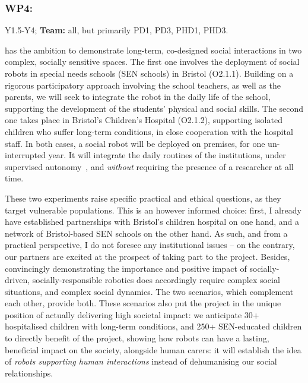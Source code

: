 \subsubsection{WP4: \textbf{\WPD}}

\begin{framed}
 Y1.5-Y4; {\bf Team:} all, but primarily PD1, PD3, PHD1, PHD3.
\end{framed}


\begin{rewrite}

\project has the ambition to demonstrate long-term, co-designed social
interactions in two complex, socially sensitive spaces.
The first one involves the deployment of social robots in special needs schools
(SEN schools) in Bristol (O2.1.1). Building on a rigorous participatory approach
involving the school teachers, as well as the parents, we will seek to integrate
the robot in the daily life of the school, supporting the development of the
students' physical and social skills. The second one takes place in Bristol's
Children's Hospital (O2.1.2), supporting isolated children who suffer long-term
conditions, in close cooperation with the hospital staff. In both cases, a
social robot will be deployed on premises, for one un-interrupted year. It will
integrate the daily routines of the institutions, under supervised
autonomy~\cite{senft2017supervised}, and \emph{without} requiring the
presence of a researcher at all time.

These two experiments raise specific practical and ethical questions, as they
target vulnerable populations. This is an however informed choice: first, I
already have established partnerships with Bristol's children hospital on one
hand, and a network of Bristol-based SEN schools on the other hand. As such, and
from a practical perspective, I do not foresee any institutional issues -- on
the contrary, our partners are excited at the prospect of taking part to the
project. Besides, convincingly demonstrating the importance and positive impact
of socially-driven, socially-responsible robotics does accordingly require
complex social situations, and complex social dynamics. The two scenarios, which
complement each other, provide both. These scenarios also put the project in the
unique position of actually delivering high societal impact: we anticipate 30+
hospitalised children with long-term conditions, and 250+ SEN-educated children
to directly benefit of the project, showing how robots can have a lasting,
beneficial impact on the society, alongside human carers: it will establish the
idea of \emph{robots supporting human interactions} instead of dehumanising our
social relationships.


\end{rewrite}
